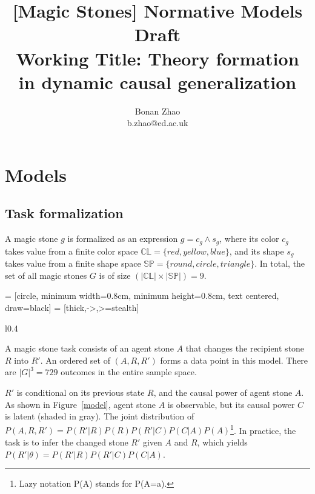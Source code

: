 \documentclass{article}
\title{
	[Magic Stones] Normative Models Draft \\
	\large Working Title:
	Theory formation in dynamic causal generalization
}
\author{
	Bonan Zhao\\
	b.zhao@ed.ac.uk
}
\newcommand{\colorspace}{\mathbb{CL}}
\newcommand{\shapespace}{\mathbb{SP}}
\begin{document}
\maketitle

\section{Models}

\subsection*{Task formalization}

A magic stone $g$ is formalized as an expression $g = c_g \wedge s_g$, 
where its color $c_g$ takes value from a finite color space $\colorspace=\{red, yellow, blue\}$, 
and its shape $s_g$ takes value from a finite shape space $\shapespace=\{round, circle, triangle\}$.
In total, the set of all magic stones $G$ is of size $(|\colorspace| \times |\shapespace|) = 9$.

 = [circle, minimum width=0.8cm, minimum height=0.8cm, text centered, draw=black]
 = [thick,->,>=stealth]
\begin{wrapfigure}{l}{0.4\textwidth}
\begin{center}
	\caption{Model of a magic stone task.}
	\label{model}
\end{center}
\end{wrapfigure}

A magic stone task consists of an agent stone $A$ that changes the recipient stone $R$ into $R'$.
An ordered set of $(A, R, R')$ forms a data point in this model. There are $|G|^3 = 729$ outcomes in the entire sample space.

$R'$ is conditional on its previous state $R$, and the causal power of agent stone $A$. As shown in Figure~\ref{model}, agent stone $A$ is observable, but its causal power $C$ is latent (shaded in gray).
The joint distribution of $P(A, R, R') = P(R'|R)P(R)P(R'|C)P(C|A)P(A)$\footnote{
	Lazy notation P(A) stands for P(A=a).
}.
In practice, the task is to infer the changed stone $R'$ given $A$ and $R$, which yields $P(R'|\theta) = P(R'|R)P(R'|C)P(C|A)$.
\end{document}
